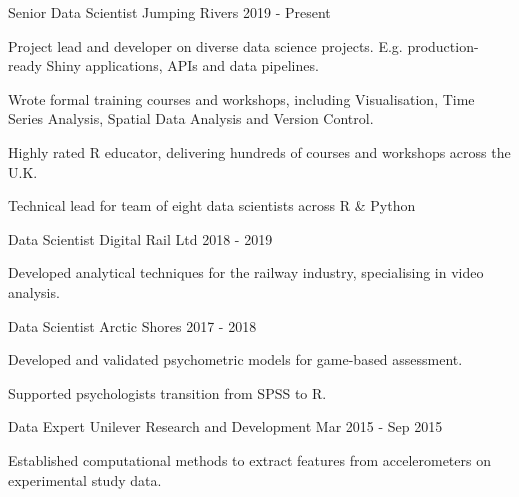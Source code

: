 \begin{cventries}

        \cventry
    {Senior Data Scientist}
    {Jumping Rivers}
    {}
    {2019 - Present}
    {
      \begin{cvitems}
        \item Project lead and developer on diverse data science projects. E.g. production-ready Shiny applications, APIs and data pipelines.
        \item Wrote formal training courses and workshops, including Visualisation, Time Series Analysis, Spatial Data Analysis and Version Control.
        \item Highly rated R educator, delivering hundreds of courses and workshops across the U.K.
        \item Technical lead for team of eight data scientists across R \& Python
      \end{cvitems}
    }

    \cventry
    {Data Scientist}
    {Digital Rail Ltd}
    {}
    {2018 - 2019}
    {
      \begin{cvitems}
        \item Developed analytical techniques for the railway industry, specialising in video analysis.
      \end{cvitems}
    }

     \cventry
    {Data Scientist}
    {Arctic Shores}
    {}
    {2017 - 2018}
    {
      \begin{cvitems}
        \item Developed and validated psychometric models for game-based assessment.
         \item Supported psychologists transition from SPSS to R.
      \end{cvitems}
    }

  \cventry
    {Data Expert}
    {Unilever Research and Development}
    {}
    {Mar 2015 - Sep 2015}
    {
      \begin{cvitems}
        \item Established computational methods to extract features from accelerometers on experimental study data.
      \end{cvitems}
    }

\end{cventries}
